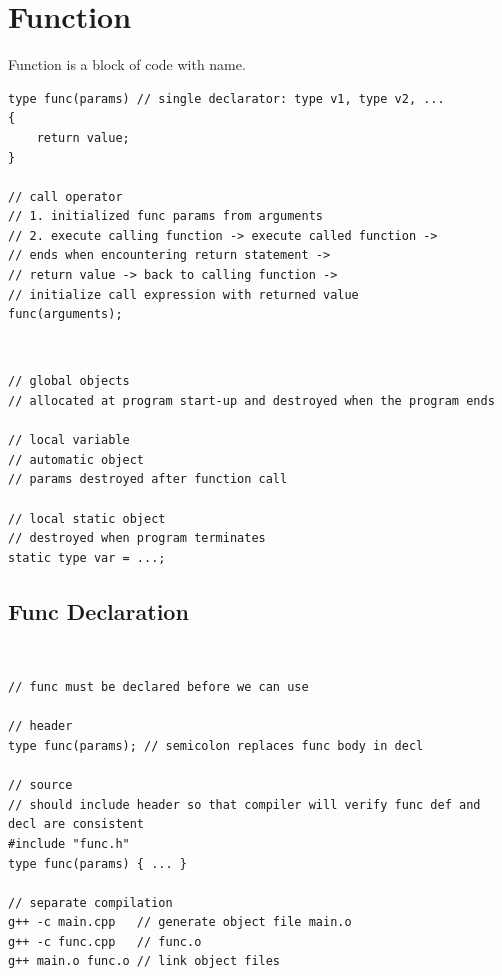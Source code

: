 \documentclass{blog}
\begin{document}
\section{Function}
\begin{definition}[func]
    Function is a block of code with name.
    \begin{verbatim}
type func(params) // single declarator: type v1, type v2, ...
{
    return value;
}

// call operator
// 1. initialized func params from arguments
// 2. execute calling function -> execute called function ->
// ends when encountering return statement ->
// return value -> back to calling function ->
// initialize call expression with returned value
func(arguments);
\end{verbatim}
\end{definition}

\begin{definition}[lifetime]~
    \begin{verbatim}
// global objects
// allocated at program start-up and destroyed when the program ends

// local variable
// automatic object
// params destroyed after function call

// local static object
// destroyed when program terminates
static type var = ...;
\end{verbatim}
\end{definition}

\subsection{Func Declaration}
\begin{definition}~
    \begin{verbatim}
// func must be declared before we can use

// header
type func(params); // semicolon replaces func body in decl

// source
// should include header so that compiler will verify func def and decl are consistent
#include "func.h"
type func(params) { ... }

// separate compilation
g++ -c main.cpp   // generate object file main.o
g++ -c func.cpp   // func.o
g++ main.o func.o // link object files
\end{verbatim}
\end{definition}
\end{document}
